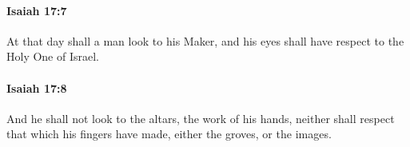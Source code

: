		\paragraph{Isaiah 17:7} %
			\label{ISAIAH-17-7}

			At that day shall a man look to his Maker, and his eyes shall have respect to the Holy One of Israel.


		\paragraph{Isaiah 17:8} %
			\label{ISAIAH-17-8}

			And he shall not look to the altars, the work of his hands, neither shall respect that which his fingers have made, either the groves, or the images.


